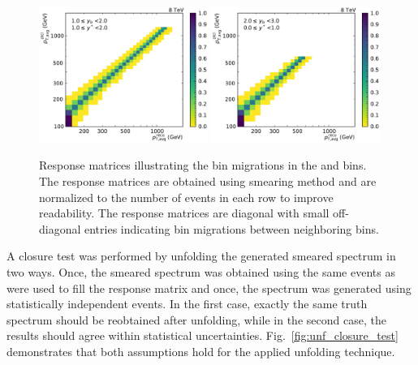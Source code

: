 \begin{figure}[htp]
    \includegraphics[width=0.49\textwidth]{figures/measurement/res_matrix_ptavg_normalized_yb1ys1.pdf}\hfill
    \includegraphics[width=0.49\textwidth]{figures/measurement/res_matrix_ptavg_normalized_yb2ys0.pdf}
    \caption[Response matrix used for the unfolding procedure]{Response matrices
        illustrating the bin migrations in the \ystar and \yboost bins. The
        response matrices are obtained using smearing method and are normalized
        to the number of events in each row to improve readability. The response
        matrices are diagonal with small off-diagonal entries indicating bin
    migrations between neighboring bins.}
    \label{fig:res_matrix}
\end{figure}

A closure test was performed by unfolding the generated smeared spectrum in two
ways. Once, the smeared spectrum was obtained using the same events as were used
to fill the response matrix and once, the spectrum was generated using
statistically independent events. In the first case, exactly the same truth spectrum should
be reobtained after unfolding, while in the second case, the results should
agree within statistical uncertainties. Fig.~\ref{fig:unf_closure_test} demonstrates that both
assumptions hold for the applied unfolding technique.

